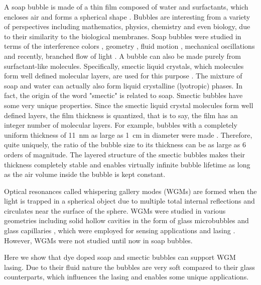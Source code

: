 \documentclass[a4paper,12pt]{article}
\begin{document}
	A soap bubble is made of a thin film composed of water and surfactants, which encloses air and forms a spherical shape \cite{isenberg1978science}. Bubbles are interesting from a variety of perspectives including mathematics, physics, chemistry and even biology, due to their similarity to the biological membranes. Soap bubbles were studied in terms of the interference colors \cite{afanasyev2011measuring}, geometry \cite{almgren1976geometry,taylor1976structure}, fluid motion \cite{debregeas1998life,meuel2013intensity}, mechanical oscillations \cite{kornek2010oscillations} and recently, branched flow of light \cite{patsyk2020observation}. A bubble can also be made purely from surfactant-like molecules. Specifically, smectic liquid crystals, which molecules form well defined molecular layers, are used for this purpose \cite{stannarius1998self,may2012dynamics,clark2017realization,lopez2011nematic}. The mixture of soap and water can actually also form liquid crystalline (lyotropic) phases. In fact, the origin of the word "smectic" is related to soap. Smectic bubbles have some very unique properties. Since the smectic liquid crystal molecules form well defined layers, the film thickness is quantized, that is to say, the film has an integer number of molecular layers. For example, bubbles with a completely uniform thickness of \SI{11}{nm} as large as \SI{1}{cm} in diameter were made \cite{stannarius1998self}. Therefore, quite uniquely, the ratio of the bubble size to its thickness can be as large as 6 orders of magnitude. The layered structure of the smectic bubbles makes their thickness completely stable and enables virtually infinite bubble lifetime as long as the air volume inside the bubble is kept constant. 
	
	Optical resonances called whispering gallery modes (WGMs) are formed when the light is trapped in a spherical object due to multiple total internal reflections and circulates near the surface of the sphere. WGMs were studied in various geometries including solid hollow cavities in the form of glass microbubbles \cite{sumetsky2010optical,watkins2011single} and glass capillaries \cite{shopova2007optofluidic}, which were employed for sensing applications \cite{ward2014hollow} and lasing \cite{shopova2007optofluidic,chen2016lasing}. However, WGMs were not studied until now in soap bubbles.
	
	
	Here we show that dye doped soap and smectic bubbles can support WGM lasing. Due to their fluid nature the bubbles are very soft compared to their glass counterparts, which influences the lasing and enables some unique applications.
	
\end{document}
